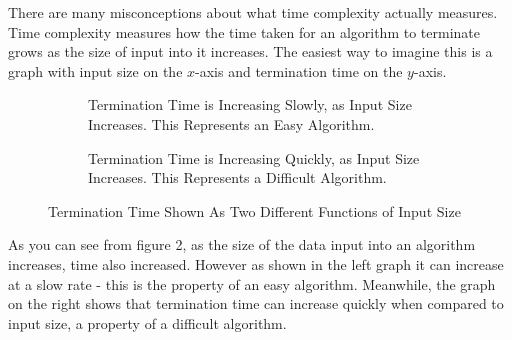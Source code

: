 \documentclass[twoside,10pt]{article}
\begin{document}
There are many misconceptions about what time complexity actually measures. Time complexity measures how the time taken for an algorithm to terminate grows as the size of input into it increases. The easiest way to imagine this is a graph with input size on the $x$-axis and termination time on the $y$-axis.
\begin{figure}[h]
\centering
\begin{subfigure}{0.45\textwidth}
\centering
{}
\caption{Termination Time is Increasing Slowly, as Input Size Increases. This Represents an Easy Algorithm.}
\label{fig:radicalgraph}
\end{subfigure}
\hspace{0.5cm}
\begin{subfigure}{0.45\textwidth}
\centering
{}
\caption{Termination Time is Increasing Quickly, as Input Size Increases. This Represents a Difficult Algorithm.}
\label{fig:exponentialgraph}
\end{subfigure}
\caption{Termination Time Shown As Two Different Functions of Input Size}
\label{fig:comparison}
\end{figure}

As you can see from figure 2, as the size of the data input into an algorithm increases, time also increased. However as shown in the left graph it can increase at a slow rate - this is the property of an easy algorithm. Meanwhile, the graph on the right shows that termination time can increase quickly when compared to input size, a property of a difficult algorithm.
\end{document}
